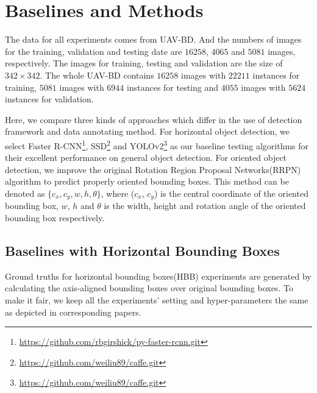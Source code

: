 \section{Baselines and Methods}
\label{sec:exp}


The data for all experiments comes from UAV-BD. And the numbers of images for the training, validation and testing date are $ 16258 $, $ 4065 $ and $ 5081 $ images, respectively. The images for training, testing and validation are the size of $ 342 \times 342 $. The whole UAV-BD contains $ 16258 $ images with $ 22211 $ instances for training, $ 5081 $ images with $ 6944 $ instances for testing and $ 4055 $ images with $ 5624 $ instances for validation.


Here, we compare three kinds of approaches which differ in the use of detection framework and data annotating method. For horizontal object detection, we select Faster R-CNN\footnote{\url{https://github.com/rbgirshick/py-faster-rcnn.git}}\cite{FasterRCNN},  SSD\footnote{\url{https://github.com/weiliu89/caffe.git}}\cite{SSD} and YOLOv2\footnote{\url{https://github.com/weiliu89/caffe.git}}\cite{SSD} as our baseline testing algorithms for their excellent performance on general object detection. For oriented object detection, we improve the original Rotation Region Proposal Networks(RRPN) algorithm\cite{RRPN} to predict properly oriented bounding boxes. This method can be denoted as $ \{c_x, c_y, w, h, \theta\} $, where ($ c_x $, $ c_y $) is the central coordinate of the oriented bounding box, $ w $, $ h $ and $ \theta $ is the width, height and rotation angle of the oriented bounding box respectively.

%	
%	
%	
%	


\subsection{Baselines with Horizontal Bounding Boxes}

Ground truths for horizontal bounding boxes(HBB) experiments are generated by calculating the axis-aligned bounding boxes over original bounding boxes. To make it fair, we keep all the experiments' setting and hyper-parameters the same as depicted in corresponding papers\cite{FasterRCNN, SSD, YOLOv2}.

